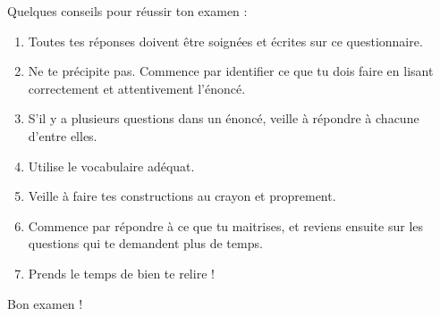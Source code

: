 \documentclass[parskip=half-,DIV=12,twoside=semi, 12pt]{scrartcl}
\newcounter{l}
\begin{document}
\medbreak
Quelques conseils pour réussir ton examen :
\begin{enumerate}[itemsep=0.5cm, label=$\bullet$]
    \item Toutes tes réponses doivent être soignées et écrites sur ce questionnaire.
    \item Ne te précipite pas. Commence par identifier ce que tu dois faire en lisant correctement et attentivement l'énoncé.
    \item S'il y a plusieurs questions dans un énoncé, veille à répondre à chacune d'entre elles.
    \item Utilise le vocabulaire adéquat.
    \item Veille à faire tes constructions au crayon et proprement.
    \item Commence par répondre à ce que tu maitrises, et reviens ensuite sur les questions qui te demandent plus de temps.
    \item Prends le temps de bien te relire !
\end{enumerate}
\vfill
\begin{flushright}
    Bon examen !
\end{flushright}
\cleardoublepage
\setcounter{page}{1}
\pagestyle{plain}
\end{document}

